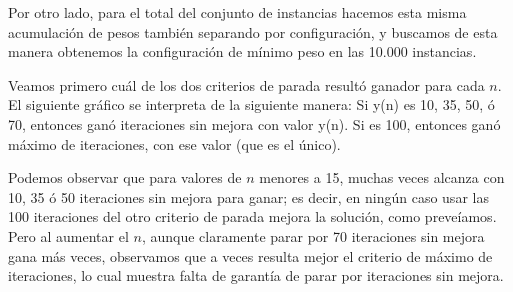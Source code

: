 Por otro lado, para el total del conjunto de instancias hacemos esta misma acumulación de pesos también separando por configuración, y buscamos de esta manera obtenemos la configuración de mínimo peso en las 10.000 instancias.

Veamos primero cuál de los dos criterios de parada resultó ganador para cada $n$. El siguiente gráfico se interpreta de la siguiente manera: Si y(n) es 10, 35, 50, ó 70, entonces ganó iteraciones sin mejora con valor y(n). Si es 100, entonces ganó máximo de iteraciones, con ese valor (que es el único).
\begin{figure}[H]
    \begin{minipage}[t]{\linewidth}
		\centering
		\label{fig:ejercicio-5-configuracion-conjunto-1}
    \end{minipage}
\end{figure}
Podemos observar que para valores de $n$ menores a 15, muchas veces alcanza con 10, 35 ó 50 iteraciones sin mejora para ganar; es decir, en ningún caso usar las 100 iteraciones del otro criterio de parada mejora la solución, como preveíamos. Pero al aumentar el $n$, aunque claramente parar por 70 iteraciones sin mejora gana más veces, observamos que a veces resulta mejor el criterio de máximo de iteraciones, lo cual muestra falta de garantía de parar por iteraciones sin mejora.

